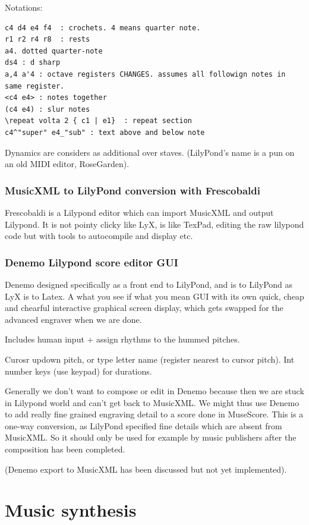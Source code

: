 \documentclass[oneside,english]{scrbook}
\begin{document}
Notations:
\begin{lstlisting}
c4 d4 e4 f4  : crochets. 4 means quarter note.
r1 r2 r4 r8  : rests
a4. dotted quarter-note
ds4 : d sharp
a,4 a'4 : octave registers CHANGES. assumes all followign notes in same register.
<c4 e4> : notes together
(c4 e4) : slur notes
\repeat volta 2 { c1 | e1}  : repeat section
c4^"super" e4_"sub" : text above and below note 
\end{lstlisting}

Dynamics are considers as additional over staves.  (LilyPond's name is a pun on an old MIDI editor, RoseGarden).

\subsection{MusicXML to LilyPond conversion with Frescobaldi}

Frescobaldi is a Lilypond editor which can import MusicXML and output Lilypond.
It is not pointy clicky like LyX, is like TexPad, editing the raw lilypond code but with tools to autocompile and display etc.

\subsection{Denemo Lilypond score editor GUI}
Denemo designed specifically as a front end to LilyPond, and is to LilyPond as LyX is to Latex.  A what you see if what you mean GUI with its own quick, cheap and chearful interactive graphical screen display, which gets swapped for the advanced engraver when we are done.

Includes human input + assign rhythms to the hummed pitches.

Curosr updown pitch, or type letter name (register nearest to cursor pitch).  Int number keys (use keypad) for durations.

Generally we don't want to compose or edit in Denemo because then we are stuck in Lilypond world and can't get back to MusicXML.  We might thus use Denemo to add really fine grained engraving detail to a score done in MuseScore.  This is a one-way conversion, as LilyPond specified fine details which are absent from MusicXML.   So it should only be used for example by music publishers after the composition has been completed.

(Denemo export to MusicXML has been discussed but not yet implemented).
\chapter{Music synthesis}
\end{document}
